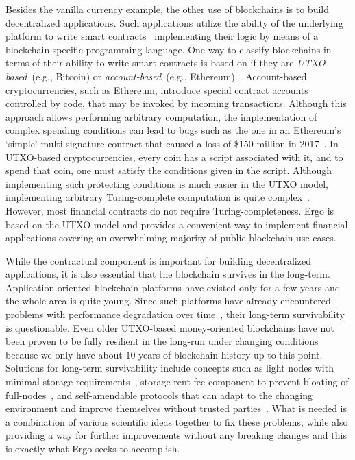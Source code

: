 Besides the vanilla currency example, the other use of blockchains is to build decentralized applications.
Such applications utilize the ability of the underlying platform to write smart contracts~\cite{szabo1994smart} implementing their logic by means of a blockchain-specific programming language.
One way to classify blockchains in terms of their ability to write smart contracts is based on if they are  
{\em UTXO-based}~(e.g., Bitcoin) or {\em account-based}~(e.g., Ethereum)~\cite{zahnentferner2018chimeric}. 
Account-based cryptocurrencies, such as Ethereum, introduce special contract accounts controlled by code,
that may be invoked by incoming transactions.
Although this approach allows performing arbitrary computation, the implementation of complex spending conditions
can lead to bugs such as the one in an Ethereum's `simple' multi-signature contract that caused a loss of \$150 million in 2017~\cite{parityLock}.
In UTXO-based cryptocurrencies, every coin has a script associated with it, and to spend that coin, one must satisfy the conditions given in the script. 
Although implementing such protecting conditions is much easier in the UTXO model, implementing arbitrary Turing-complete computation is quite complex~\cite{chepurnoy2018self}. However, most financial contracts do not require Turing-completeness. Ergo is based on the UTXO model and provides a convenient way to implement financial applications covering an
overwhelming majority of public blockchain use-cases.

While the contractual component is important for building decentralized applications,
it is also essential that the blockchain survives in the long-term.
Application-oriented blockchain platforms have existed only for a few years and the whole area is quite young. Since such platforms have already encountered problems with performance degradation over time~\cite{???}, their long-term survivability is questionable.
Even older UTXO-based money-oriented blockchains have not been proven to be fully resilient in the long-run
under changing conditions because we only have about 10 years of blockchain history up to this point.
Solutions for long-term survivability include concepts 
such as light nodes with minimal storage requirements~\cite{reyzin2017improving},
storage-rent fee component to prevent bloating of full-nodes~\cite{chepurnoy2018systematic}, and 
self-amendable protocols that can adapt to the changing environment and improve themselves without
trusted parties~\cite{goodman2014tezos}.
What is needed is a combination of various scientific ideas together to fix these problems, while also
providing a way for further improvements without any breaking changes and this is exactly what Ergo seeks to accomplish.

